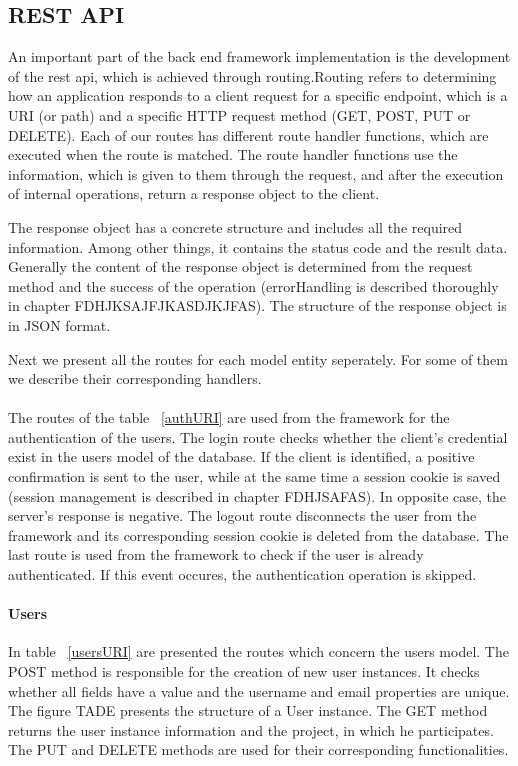\subsection{REST API}
An important part of the back end framework implementation is the development of the rest api, which is achieved through routing.Routing refers to determining how an application responds to a client request for a specific endpoint, which is a URI (or path) and a specific HTTP request method (GET, POST, PUT or DELETE). Each of our routes has different route handler functions, which are executed when the route is matched. The route handler functions use the information, which is given to them through the request, and after the execution of internal operations, return a response object to the client.\par
	 The response object has a concrete structure and includes all the required information. Among other things, it contains the status code and the result data. Generally the content of the response object is determined from the request method and the success of the operation (errorHandling is described thoroughly in chapter FDHJKSAJFJKASDJKJFAS). The structure of the response object is in JSON format. \par 
	 	Next we present all the routes for each model entity seperately. For some of them we describe their corresponding handlers.
	 	
\paragraph{}
The routes of the table ~\ref{authURI} are used from the framework for the authentication of the users. The login route checks whether the client's credential exist in the users model of the database. If the client is identified, a positive confirmation is sent to the user, while at the same time a session cookie is saved (session management is described in chapter FDHJSAFAS). In opposite case, the server's response is negative. The logout route disconnects the user from the framework and its corresponding session cookie is deleted from the database. The last route is used from the framework to check if the user is already authenticated. If this event occures, the authentication operation is skipped.

\paragraph{Users}

In table ~\ref{usersURI} are presented the routes which concern the users model. The POST method is responsible for the creation of new user instances. It checks whether all fields have a value and the username and email properties are unique. The figure TADE presents the structure of a User instance. The GET method returns the user instance information and the project, in which he participates. The PUT and DELETE methods are used for their corresponding functionalities.


